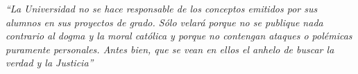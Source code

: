\fontsize{11pt}{11pt}\selectfont
\textit{“La Universidad no se hace responsable de los conceptos emitidos por sus alumnos en sus proyectos de grado. Sólo velará porque no se publique nada contrario al dogma y la moral católica y porque no contengan ataques o polémicas puramente personales. Antes bien, que se vean en ellos el anhelo de buscar la verdad y la Justicia”}\\


		




